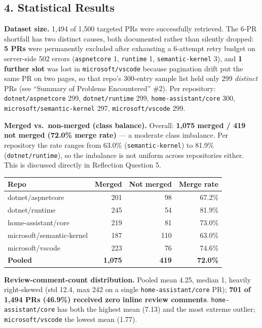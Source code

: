 \documentclass{experimentreport}
\begin{document}
{\subsection*{4. Statistical Results}

\textbf{Dataset size.} 1{,}494 of 1{,}500 targeted PRs were successfully retrieved. The 6-PR
shortfall has two distinct causes, both documented rather than silently dropped: \textbf{5 PRs}
were permanently excluded after exhausting a 6-attempt retry budget on server-side 502 errors
(\texttt{aspnetcore} 1, \texttt{runtime} 1, \texttt{semantic-kernel} 3), and \textbf{1 further slot}
was lost in \texttt{microsoft/vscode} because pagination drift put the same PR on two pages, so that
repo's 300-entry sample list held only 299 \emph{distinct} PRs (see ``Summary of Problems
Encountered'' \#2). Per repository: \texttt{dotnet/aspnetcore} 299, \texttt{dotnet/runtime} 299,
\texttt{home-assistant/core} 300, \texttt{microsoft/semantic-kernel} 297, \texttt{microsoft/vscode}
299.

\textbf{Merged vs.\ non-merged (class balance).} Overall: \textbf{1{,}075 merged / 419 not merged
(72.0\% merge rate)} --- a moderate class imbalance. Per repository the rate ranges from 63.0\%
(\texttt{semantic-kernel}) to 81.9\% (\texttt{dotnet/runtime}), so the imbalance is not uniform
across repositories either. This is discussed directly in Reflection Question 5.

\begin{center}
\begin{tabular}{|l|r|r|r|}
\hline
\textbf{Repo} & \textbf{Merged} & \textbf{Not merged} & \textbf{Merge rate} \\
\hline
dotnet/aspnetcore & 201 & 98 & 67.2\% \\
dotnet/runtime & 245 & 54 & 81.9\% \\
home-assistant/core & 219 & 81 & 73.0\% \\
microsoft/semantic-kernel & 187 & 110 & 63.0\% \\
microsoft/vscode & 223 & 76 & 74.6\% \\
\hline
\textbf{Pooled} & \textbf{1{,}075} & \textbf{419} & \textbf{72.0\%} \\
\hline
\end{tabular}
\end{center}

\textbf{Review-comment-count distribution.} Pooled mean 4.25, median 1, heavily right-skewed
(std 12.4, max 242 on a single \texttt{home-assistant/core} PR); \textbf{701 of 1{,}494 PRs
(46.9\%) received zero inline review comments}. \texttt{home-assistant/core} has both the highest
mean (7.13) and the most extreme outlier; \texttt{microsoft/vscode} the lowest mean (1.77).

}
\end{document}
